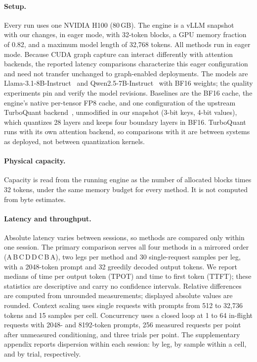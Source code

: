 \documentclass{article}
\begin{document}
\paragraph{Setup.}
Every run uses one NVIDIA H100 (80\,GB). The engine is a vLLM snapshot~\citep{kwon2023vllm} with our changes, in eager
mode, with 32-token blocks, a GPU memory fraction of 0.82, and a maximum model length of 32,768 tokens.
All methods run in eager mode. Because CUDA graph capture can interact differently with attention
backends, the reported latency comparisons characterize this eager configuration and need not transfer
unchanged to graph-enabled deployments.
The models are Llama-3.1-8B-Instruct~\citep{meta2024llama31} and Qwen2.5-7B-Instruct~\citep{yang2024qwen25} with BF16
weights; the quality experiments pin and verify the model revisions. Baselines are the BF16 cache, the engine's native per-tensor FP8 cache, and one configuration of
the upstream TurboQuant backend~\citep{vllm2026turboquant}, unmodified in our snapshot (3-bit keys,
4-bit values), which quantizes 28 layers and keeps four boundary layers in BF16. TurboQuant
runs with its own attention backend, so comparisons with it are between systems as deployed, not
between quantization kernels.

\paragraph{Physical capacity.}
Capacity is read from the running engine as the number of allocated blocks times 32 tokens, under the
same memory budget for every method. It is not computed from byte estimates.

\paragraph{Latency and throughput.}
Absolute latency varies between sessions, so methods are compared only within one session. The primary
comparison serves all four methods in a mirrored order (A\,B\,C\,D\,D\,C\,B\,A), two legs per method
and 30 single-request samples per leg, with a 2048-token prompt and 32 greedily decoded output tokens.
We report medians of time per output token (TPOT) and time to first token (TTFT); these statistics are
descriptive and carry no confidence intervals. Relative differences are computed from unrounded
measurements; displayed absolute values are rounded. Context scaling uses single requests with prompts from
512 to 32,736 tokens and 15 samples per cell. Concurrency uses a closed loop at 1 to 64 in-flight
requests with 2048- and 8192-token prompts, 256 measured requests per point after unmeasured
conditioning, and three trials per point. The supplementary appendix reports dispersion within each
session: by leg, by sample within a cell, and by trial, respectively.
\end{document}
